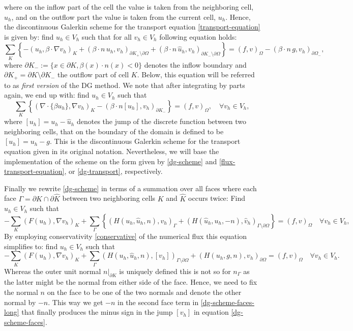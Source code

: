 \documentclass[11pt]{article}
\begin{document}
where on the inflow part of the cell the value is taken from the
neighboring cell, $\hat u_h$, and on the outflow part the value is
taken from the current cell, $u_h$.  Hence, the discontinuous Galerkin
scheme for the transport equation \eqref{transport-equation} is given
by: find $u_h\in V_h$ such that for all $v_h\in V_h$ following
equation holds:
\begin{equation}\label{dg-transport}
  \sum_K\left\{-(u_h,\beta\cdot\nabla v_h)_K+(\beta\cdot n\, u_h, v_h)_{\partial K_+\setminus\partial\Omega}+(\beta\cdot n\, \hat u_h, v_h)_{\partial K_-\setminus\partial\Omega}\right\}=(f,v)_\Omega-(\beta\cdot n\, g, v_h)_{\partial\Omega_-},
\end{equation}
where $\partial K_-:=\{x\in\partial K, \beta(x)\cdot n(x)<0\}$ denotes
the inflow boundary and $\partial K_+=\partial K\setminus \partial
K_-$ the outflow part of cell $K$. Below, this equation will be
referred to as \emph{first version} of the DG method. We note that
after integrating by parts again, we end up with: find $u_h\in V_h$
such that
\[
  \sum_K\left\{(\nabla\cdot\{\beta u_h\},\nabla v_h)_K-(\beta\cdot n [u_h], v_h)_{\partial K_-}\right\}=(f,v)_\Omega, \quad\forall v_h\in V_h,
\]
where $[u_h]=u_h-\hat u_h$ denotes the jump of the discrete function
between two neighboring cells, that on the boundary of the domain is defined to be $[u_h]=u_h-g$. This is the discontinuous Galerkin
scheme for the transport equation given in its original notation.
Nevertheless, we will base the implementation of the scheme on the form
given by \eqref{dg-scheme} and \eqref{flux-transport-equation}, or
\eqref{dg-transport}, respectively.

Finally we rewrite \eqref{dg-scheme} in terms of a summation over all faces 
where each face $\Gamma=\partial
K\cap\partial \hat K$ between two neighboring cells $K$ and $\hat K$
occurs twice: Find $u_h\in V_h$ such that
\begin{equation}\label{dg-scheme-faces-long}
  -\sum_K(F(u_h),\nabla v_h)_K+\sum_\Gamma\left\{(H(u_h,\hat u_h,n), v_h)_\Gamma+(H(\hat u_h, u_h,-n), \hat v_h)_{\Gamma\setminus\partial\Omega}\right\}=(f,v)_\Omega \quad\forall v_h\in V_h,
\end{equation}
By employing conservativity \eqref{conservative} of the numerical flux
this equation simplifies to: find $u_h\in V_h$ such that
\begin{equation}\label{dg-scheme-faces}
  -\sum_K(F(u_h),\nabla v_h)_K+\sum_\Gamma(H(u_h,\hat u_h,n), [v_h])_{\Gamma\setminus\partial\Omega}+(H(u_h,g,n), v_h)_{\partial\Omega}=(f,v)_\Omega \quad\forall v_h\in V_h.
\end{equation}
Whereas the outer unit normal $n|_{\partial K}$ is uniquely defined
this is not so for $n_\Gamma$ as the latter might be the normal from
either side of the face. Hence, we need to fix the normal $n$ on the
face to be one of the two normals and denote the other normal by $-n$.
This way we get $-n$ in the second face term in
\eqref{dg-scheme-faces-long} that finally produces the minus sign in
the jump $[v_h]$ in equation \eqref{dg-scheme-faces}.
\end{document}
